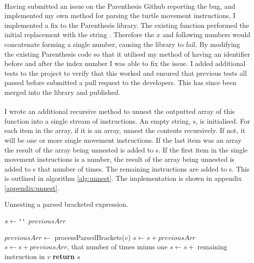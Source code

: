 \paragraph{} Having submitted an issue on the Parenthesis Github reporting the bug, and implemented my own method for parsing the turtle movement instructions, I implemented a fix to the Parenthesis library. The existing function performed the initial replacement with the string . Therefore the $x$ and following numbers would concatenate forming a single number, causing the library to fail. By modifying the existing Parenthesis code so that it utilised my method of having an identifier before and after the index number I was able to fix the issue. I added additional tests to the project to verify that this worked and ensured that previous tests all passed before submitted a pull request to the developers. This has since been merged into the library and published.

\paragraph{} I wrote an additional recursive method to unnest the outputted array of this function into a single stream of instructions. An empty string, s, is initialised. For each item in the array, if it is an array, unnest the contents recursively. If not, it will be one or more single movement instructions. If the last item was an array the result of the array being unnested is added to s. If the first item in the single movement instructions is a number, the result of the array being unnested is added to s that number of times. The remaining instructions are added to s. This is outlined in algorithm \ref{alg:unnest}. The implementation is shown in appendix \ref{appendix:unnest}.

\begin{algorithm}[!htbp]
\caption{Unnesting a parsed bracketed expression.}
\label{alg:unnest}
\begin{algorithmic}[1]

   \State $s\gets \texttt{\upquote{}}$
   \State $previousArr$

     \State $previousArr \gets$ processParsedBrackets($v$)
    \Else
        \State $s \gets s + previousArr$
          \State $s \gets s + previousArr$, that number of times minus one
        \EndIf
       \EndIf
       \State $s \gets s + $ remaining instruction in $v$
    \EndIf
   \EndFor
   \State \textbf{return} $s$

\EndProcedure
\end{algorithmic}
\end{algorithm}

